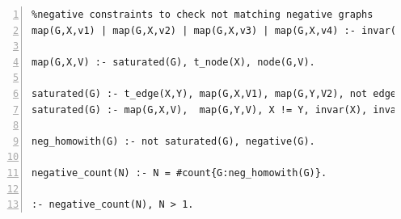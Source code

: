 \begin{lstlisting}[caption=ASP negative matching, label={lst:aspsaturation}, style=model, numbers=left]
%Saturated Representation
%negative constraints to check not matching negative graphs
map(G,X,v1) | map(G,X,v2) | map(G,X,v3) | map(G,X,v4) :- invar(X), negative(G). @\label{lstline:probspec}@

map(G,X,V) :- saturated(G), t_node(X), node(G,V).

saturated(G) :- t_edge(X,Y), map(G,X,V1), map(G,Y,V2), not edge(G,V1,V2), negative(G), invar(X), invar(Y).
saturated(G) :- map(G,X,V),  map(G,Y,V), X != Y, invar(X), invar(Y). // we cannot map two different template nodes to the same 

neg_homowith(G) :- not saturated(G), negative(G).

negative_count(N) :- N = #count{G:neg_homowith(G)}.

:- negative_count(N), N > 1.

\end{lstlisting}

%
%
%
%
%
%
%
%
%
%
%
%
%
%

